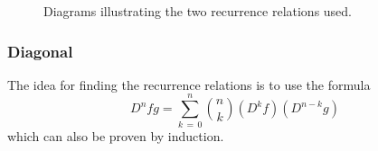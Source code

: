 \documentclass[12pt]{article}
\begin{document}
\begin{figure}[htbp]
  \centering
  \begin{subfigure}{.25\linewidth}
    \centering
    \caption{}
  \end{subfigure}
  \begin{subfigure}{.25\linewidth}
    \centering
    \caption{}
  \end{subfigure}
  \caption{Diagrams illustrating the two recurrence relations used.}
  \label{fig:individual-recurrence-relations}
\end{figure}

\subsubsection{Diagonal}

The idea for finding the recurrence relations is to use the formula
\begin{equation}
  D^{n}fg = \sum_{k\,=\,0}^{n}{n\choose k}(D^kf)(D^{n-k}g)
\end{equation}
which can also be proven by induction.
\end{document}

